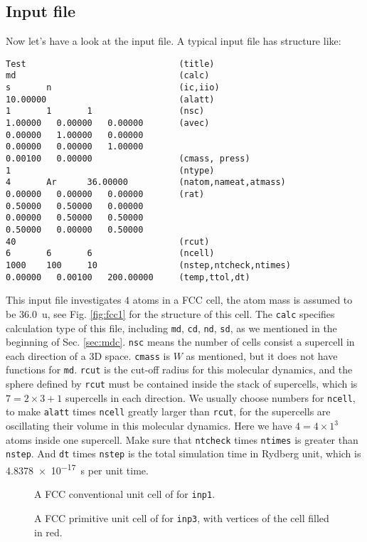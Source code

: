
\subsection{Input file}

Now let's have a look at the input file.
A typical input file has structure like:
\begin{verbatim}
Test                              (title)
md                                (calc)
s       n                         (ic,iio)
10.00000                          (alatt)
1       1       1                 (nsc)
1.00000   0.00000   0.00000       (avec)
0.00000   1.00000   0.00000
0.00000   0.00000   1.00000
0.00100   0.00000                 (cmass, press)
1                                 (ntype)
4       Ar      36.00000          (natom,nameat,atmass)
0.00000   0.00000   0.00000       (rat)
0.50000   0.50000   0.00000
0.00000   0.50000   0.50000
0.50000   0.00000   0.50000
40                                (rcut)
6       6       6                 (ncell)
1000    100     10                (nstep,ntcheck,ntimes)
0.00000   0.00100   200.00000     (temp,ttol,dt)
\end{verbatim}

This input file investigates $4$  atoms in a FCC cell, the atom mass is assumed to be \SI{36.0}{\atomicmassunit},
see Fig. \ref{fig:fcc1} for the structure of this cell.
The \texttt{calc} specifies calculation type of this file, including \texttt{md},
\texttt{cd}, \texttt{nd}, \texttt{sd}, as we mentioned in the beginning of Sec. \ref{sec:mdc}.
\texttt{nsc} means the number of cells consist a supercell in each direction of a 3D space.
\texttt{cmass} is $W$ as mentioned, but it does not have functions for \texttt{md}.
\texttt{rcut} is the cut-off radius for this molecular dynamics, and the sphere defined by
\texttt{rcut} must be contained inside the stack of supercells, which is $7=2\times 3+1$ supercells in each direction. We usually choose numbers for \texttt{ncell}, to make 
\texttt{alatt} times \texttt{ncell} greatly larger than \texttt{rcut}, for the supercells are
oscillating their volume in this molecular dynamics.
Here we have $4=4 \times 1^3$ atoms inside one supercell.
Make sure that \texttt{ntcheck} times \texttt{ntimes} is greater than
\texttt{nstep}.
And \texttt{dt} times \texttt{nstep} is the total simulation time in Rydberg unit, which is
\SI{4.8378e-17}{\second} per unit time.

\begin{figure}[H]
  \begin{minipage}{0.48\textwidth}
    \centering
    
    \caption{A FCC conventional unit cell of  for \texttt{inp1}.}
    \label{fig:fcc1}
  \end{minipage}
\hfill
  \begin {minipage}{0.48\textwidth}
  \centering
  
  \caption{A FCC primitive unit cell of  for \texttt{inp3}, with
  vertices of the cell filled in red.}
  \label{fig:fcc3}
\end{minipage}
\end{figure}

